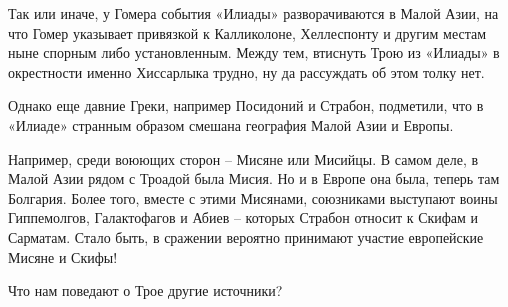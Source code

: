 Так или иначе, у Гомера события «Илиады» разворачиваются в Малой Азии, на что Гомер указывает привязкой к Калликолоне, Хеллеспонту и другим местам ныне спорным либо установленным. Между тем, втиснуть Трою из «Илиады» в окрестности именно Хиссарлыка трудно, ну да рассуждать об этом толку нет.

Однако еще давние Греки, например Посидоний и Страбон, подметили, что в «Илиаде» странным образом смешана география Малой Азии и Европы.

Например, среди воюющих сторон – Мисяне или Мисийцы. В самом деле, в Малой Азии рядом с Троадой была Мисия. Но и в Европе она была, теперь там Болгария. Более того, вместе с этими Мисянами, союзниками выступают воины Гиппемолгов, Галактофагов и Абиев – которых Страбон относит к Скифам и Сарматам. Стало быть, в сражении вероятно принимают участие европейские Мисяне и Скифы!

Что нам поведают о Трое другие источники?
